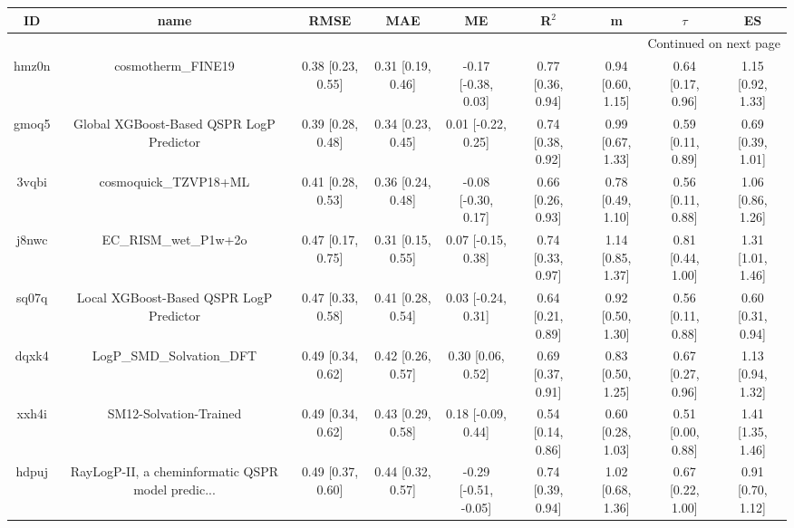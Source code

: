\documentclass{article}
\begin{document}
\begin{center}
\scriptsize
\begin{longtable}{|ccccccccc|}
\toprule
    ID &                                               name &               RMSE &                MAE &                    ME &              R$^2$ &                    m &               $\tau$ &                    ES \\
\midrule
\endhead
\midrule
\multicolumn{9}{r}{{Continued on next page}} \\
\midrule
\endfoot

\bottomrule
\endlastfoot
 hmz0n &                                 cosmotherm\_FINE19 &  0.38 [0.23, 0.55] &  0.31 [0.19, 0.46] &   -0.17 [-0.38, 0.03] &  0.77 [0.36, 0.94] &    0.94 [0.60, 1.15] &    0.64 [0.17, 0.96] &     1.15 [0.92, 1.33] \\
 gmoq5 &           Global XGBoost-Based QSPR LogP Predictor &  0.39 [0.28, 0.48] &  0.34 [0.23, 0.45] &    0.01 [-0.22, 0.25] &  0.74 [0.38, 0.92] &    0.99 [0.67, 1.33] &    0.59 [0.11, 0.89] &     0.69 [0.39, 1.01] \\
 3vqbi &                              cosmoquick\_TZVP18+ML &  0.41 [0.28, 0.53] &  0.36 [0.24, 0.48] &   -0.08 [-0.30, 0.17] &  0.66 [0.26, 0.93] &    0.78 [0.49, 1.10] &    0.56 [0.11, 0.88] &     1.06 [0.86, 1.26] \\
 j8nwc &                              EC\_RISM\_wet\_P1w+2o &  0.47 [0.17, 0.75] &  0.31 [0.15, 0.55] &    0.07 [-0.15, 0.38] &  0.74 [0.33, 0.97] &    1.14 [0.85, 1.37] &    0.81 [0.44, 1.00] &     1.31 [1.01, 1.46] \\
 sq07q &            Local XGBoost-Based QSPR LogP Predictor &  0.47 [0.33, 0.58] &  0.41 [0.28, 0.54] &    0.03 [-0.24, 0.31] &  0.64 [0.21, 0.89] &    0.92 [0.50, 1.30] &    0.56 [0.11, 0.88] &     0.60 [0.31, 0.94] \\
 dqxk4 &                          LogP\_SMD\_Solvation\_DFT &  0.49 [0.34, 0.62] &  0.42 [0.26, 0.57] &     0.30 [0.06, 0.52] &  0.69 [0.37, 0.91] &    0.83 [0.50, 1.25] &    0.67 [0.27, 0.96] &     1.13 [0.94, 1.32] \\
 xxh4i &                             SM12-Solvation-Trained &  0.49 [0.34, 0.62] &  0.43 [0.29, 0.58] &    0.18 [-0.09, 0.44] &  0.54 [0.14, 0.86] &    0.60 [0.28, 1.03] &    0.51 [0.00, 0.88] &     1.41 [1.35, 1.46] \\
 hdpuj &  RayLogP-II, a cheminformatic QSPR model predic... &  0.49 [0.37, 0.60] &  0.44 [0.32, 0.57] &  -0.29 [-0.51, -0.05] &  0.74 [0.39, 0.94] &    1.02 [0.68, 1.36] &    0.67 [0.22, 1.00] &     0.91 [0.70, 1.12] \\

\end{longtable}
\end{center}
\end{document}
